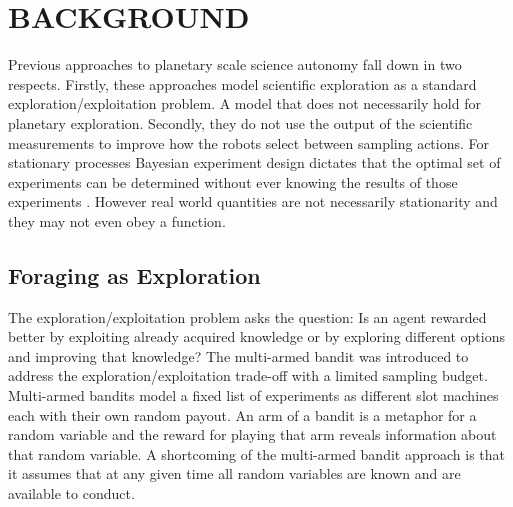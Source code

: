 \section{BACKGROUND}
\label{sec:background}


Previous approaches to planetary scale science autonomy fall down in two
respects.  Firstly, these approaches model scientific exploration as a standard
exploration/exploitation problem.  A model that does not necessarily hold for
planetary exploration.  Secondly, they do not use the output of the scientific
measurements to improve how the robots select between sampling actions.  For
stationary processes Bayesian experiment design dictates that the optimal set
of experiments can be determined without ever knowing the results of those
experiments \cite{srinivas2009gaussian}.  However real world quantities are not
necessarily stationarity and they may not even obey a function.

\subsection{Foraging as Exploration}

The exploration/exploitation problem asks the question: Is an agent rewarded
better by exploiting already acquired knowledge or by exploring different
options and improving that knowledge?  The multi-armed bandit
\cite{robbins1952some} was introduced to address the exploration/exploitation
trade-off with a limited sampling budget.  Multi-armed bandits model a fixed
list of experiments as different slot machines each with their own random
payout.  An arm of a bandit is a metaphor for a random variable and
the reward for playing that arm reveals information about that random variable.
A shortcoming of the multi-armed bandit approach is that it assumes that at any
given time all random variables are known and are available to conduct.  

